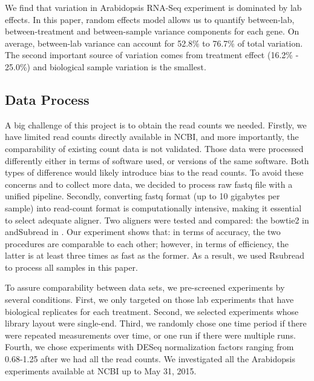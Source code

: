 \documentclass[11pt, a4paper]{article}
\begin{document}
   We find that variation in Arabidopsis RNA-Seq experiment is dominated by lab effects. In this paper, random effects model allows us to quantify  between-lab, between-treatment and between-sample variance components for each gene.
On average, between-lab variance can account for 52.8\% to 76.7\% of total variation. The second important source of variation comes from treatment effect (16.2\% - 25.0\%) and biological sample variation is the smallest. 


  \subsection{Data Process}
  A big challenge of this project is to obtain the read counts we needed. Firstly, we have limited read counts directly available in NCBI, and more importantly,  the comparability of existing count data is not validated. Those data were processed differently either in terms of software used, or versions of the same software. Both types of difference would likely introduce bias to the read counts. To avoid these concerns and to collect more data, we decided to process raw fastq file with a unified pipeline. Secondly, converting fastq format (up to 10 gigabytes per sample)  into read-count format is computationally intensive, making it essential to select adequate aligner. Two aligners were tested and compared: the bowtie2 in \cite{anders2013count} andSubread in \cite{liao2013subread}.  Our experiment shows that:  in terms of accuracy, the two procedures are comparable to each other; however, in terms of efficiency, the latter is at least three times as fast as the former. As a result, we used Rsubread to process all samples in this paper.

To assure comparability between data sets, we pre-screened experiments by several conditions. First, we only targeted on those lab experiments that have biological replicates for each treatment. Second, we selected experiments whose library layout were single-end. Third, we randomly chose one time period if there were repeated measurements over time, or one run if there were multiple runs. Fourth, we chose experiments with DESeq normalization factors ranging from 0.68-1.25 after we had all the read counts. We investigated all the Arabidopsis experiments available at NCBI up to May 31, 2015.
\end{document}
